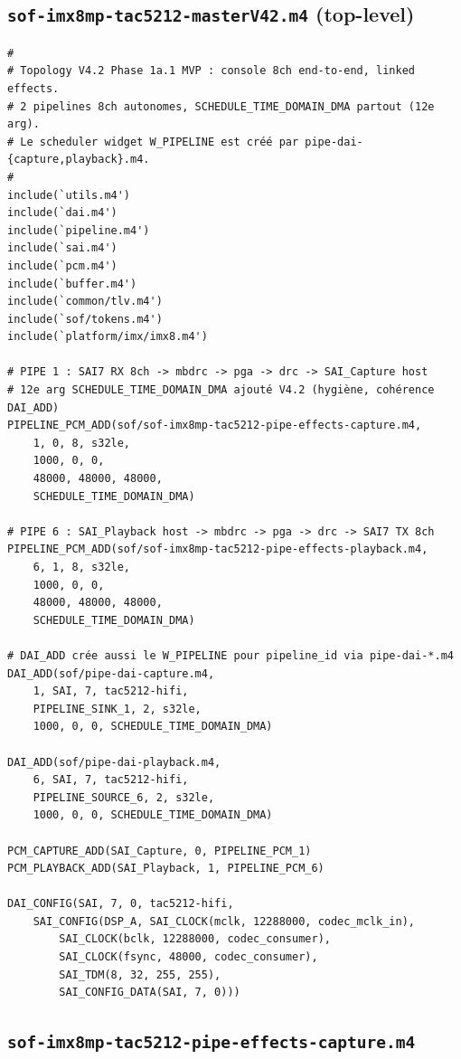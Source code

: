 \documentclass[11pt,a4paper]{article}
\begin{document}
\subsection{\texttt{sof-imx8mp-tac5212-masterV42.m4} (top-level)}

\begin{lstlisting}[language={}, basicstyle=\ttfamily\scriptsize]
#
# Topology V4.2 Phase 1a.1 MVP : console 8ch end-to-end, linked effects.
# 2 pipelines 8ch autonomes, SCHEDULE_TIME_DOMAIN_DMA partout (12e arg).
# Le scheduler widget W_PIPELINE est créé par pipe-dai-{capture,playback}.m4.
#
include(`utils.m4')
include(`dai.m4')
include(`pipeline.m4')
include(`sai.m4')
include(`pcm.m4')
include(`buffer.m4')
include(`common/tlv.m4')
include(`sof/tokens.m4')
include(`platform/imx/imx8.m4')

# PIPE 1 : SAI7 RX 8ch -> mbdrc -> pga -> drc -> SAI_Capture host
# 12e arg SCHEDULE_TIME_DOMAIN_DMA ajouté V4.2 (hygiène, cohérence DAI_ADD)
PIPELINE_PCM_ADD(sof/sof-imx8mp-tac5212-pipe-effects-capture.m4,
    1, 0, 8, s32le,
    1000, 0, 0,
    48000, 48000, 48000,
    SCHEDULE_TIME_DOMAIN_DMA)

# PIPE 6 : SAI_Playback host -> mbdrc -> pga -> drc -> SAI7 TX 8ch
PIPELINE_PCM_ADD(sof/sof-imx8mp-tac5212-pipe-effects-playback.m4,
    6, 1, 8, s32le,
    1000, 0, 0,
    48000, 48000, 48000,
    SCHEDULE_TIME_DOMAIN_DMA)

# DAI_ADD crée aussi le W_PIPELINE pour pipeline_id via pipe-dai-*.m4
DAI_ADD(sof/pipe-dai-capture.m4,
    1, SAI, 7, tac5212-hifi,
    PIPELINE_SINK_1, 2, s32le,
    1000, 0, 0, SCHEDULE_TIME_DOMAIN_DMA)

DAI_ADD(sof/pipe-dai-playback.m4,
    6, SAI, 7, tac5212-hifi,
    PIPELINE_SOURCE_6, 2, s32le,
    1000, 0, 0, SCHEDULE_TIME_DOMAIN_DMA)

PCM_CAPTURE_ADD(SAI_Capture, 0, PIPELINE_PCM_1)
PCM_PLAYBACK_ADD(SAI_Playback, 1, PIPELINE_PCM_6)

DAI_CONFIG(SAI, 7, 0, tac5212-hifi,
    SAI_CONFIG(DSP_A, SAI_CLOCK(mclk, 12288000, codec_mclk_in),
        SAI_CLOCK(bclk, 12288000, codec_consumer),
        SAI_CLOCK(fsync, 48000, codec_consumer),
        SAI_TDM(8, 32, 255, 255),
        SAI_CONFIG_DATA(SAI, 7, 0)))
\end{lstlisting}

\subsection{\texttt{sof-imx8mp-tac5212-pipe-effects-capture.m4}}
\end{document}
